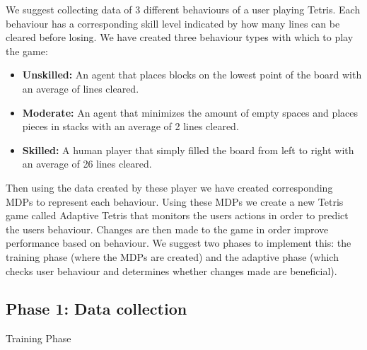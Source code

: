 \documentclass[11pt, conference, compsoc]{IEEEtran}
\makeatletter
\def\BState{\State\hskip-\ALG@thistlm}
\let\MYoriglatexcaption\caption
\renewcommand{\caption}[2][\relax]{\MYoriglatexcaption[#2]{#2}}
\makeatother
\begin{document}
We suggest collecting data of 3 different behaviours of a user playing Tetris. Each behaviour has a corresponding skill level indicated by how many lines can be cleared before losing. We have created three behaviour types with which to play the game:
\begin{itemize}
\item \textbf{Unskilled:} An agent that places blocks on the lowest point of the board with an average of lines cleared.
\item \textbf{Moderate:} An agent that minimizes the amount of empty spaces and places pieces in stacks with an average of 2 lines cleared.
\item \textbf{Skilled:} A human player that simply filled the board from left to right with an average of 26 lines cleared.
\end{itemize}
Then using the data created by these player we have created corresponding MDPs to represent each behaviour. Using these MDPs we create a new Tetris game called Adaptive Tetris that monitors the users actions in order to predict the users behaviour. Changes are then made to the game in order improve performance based on behaviour.
We suggest two phases to implement this: the training phase (where the MDPs are created) and the adaptive phase (which checks user behaviour and determines whether changes made are beneficial).
\subsection{    Phase 1: Data collection}

\begin{algorithm}
\caption{Training Phase}\label{euclid}
\end{algorithm}
\end{document}
